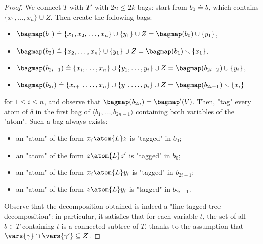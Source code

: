 \begin{proof}
   	We connect $T$ with $T'$ with $2n \leq 2k$ bags:
    start from $b_0 \mathrel{\hat{=}} b$, which contains $\{x_1,\hdots,x_n\}\cup Z$. Then create
    the following bags:
    \begin{itemize}
        \item $\bagmap(b_1) \defeq \{x_1,x_2,\hdots,x_n\}\cup\{y_1\}\cup Z
            = \bagmap(b_0) \cup \{y_1\}$, 
        \item $\bagmap(b_2) \defeq \{x_2,\hdots,x_n\}\cup\{y_1\}\cup Z
            = \bagmap(b_1) \smallsetminus \{x_1\}$,
        \item $\bagmap(b_{2i-1}) \defeq \{x_i,\hdots,x_n\}\cup\{y_1,\hdots,y_i\}\cup Z
            = \bagmap(b_{2i-2}) \cup \{y_i\}$,
        \item $\bagmap(b_{2i}) \defeq \{x_{i+1},\hdots,x_n\}\cup\{y_1,\hdots,y_i\}\cup Z
            = \bagmap(b_{2i-1}) \smallsetminus \{x_i\}$
    \end{itemize}
    for $1 \leq i \leq n$, and observe that $\bagmap(b_{2n}) = \bagmap'(b')$.
    Then, "tag" every atom of $\delta$ in the first bag of
	$\langle b_1, \hdots, b_{2n-1} \rangle$ containing both variables of the "atom".
	Such a bag always exists:
	\begin{itemize}
		\item an "atom" of the form $x_i \atom{L} z$ is "tagged" in $b_0$;
		\item an "atom" of the form $z \atom{L} z'$ is "tagged" in $b_0$;
		\item an "atom" of the form $x_i \atom{L} y_i$ is "tagged" in $b_{2i-1}$;
		\item an "atom" of the form $z \atom{L} y_i$ is "tagged" in $b_{2i-1}$.
	\end{itemize}
	Observe that the decomposition obtained is indeed a "fine tagged tree decomposition":
	in particular, it satisfies that for each variable $t$, the set of all $b \in T$
	containing $t$ is a connected subtree of $T$, thanks to the assumption that
	$\vars{\gamma} \cap \vars{\gamma'} \subseteq Z$.
\end{proof} 